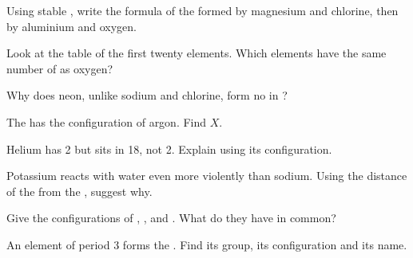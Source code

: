 \begin{exercise}[$\star\star$]\label{exo:g10:electron-shells:8}
Using stable , write the formula of the  formed by
magnesium and chlorine, then by aluminium and oxygen.
\end{exercise}

\begin{exercise}[$\star\star$]\label{exo:g10:electron-shells:9}
Look at the table of the first twenty elements. Which elements have the
same number of  as oxygen?
\end{exercise}

\begin{exercise}[$\star\star$]\label{exo:g10:electron-shells:10}
Why does neon, unlike sodium and chlorine, form no  in ?
\end{exercise}

\begin{exercise}[$\star\star$]\label{exo:g10:electron-shells:11}
The   has the configuration of argon. Find $X$.
\end{exercise}

\begin{exercise}[$\star\star\star$]\label{exo:g10:electron-shells:12}
Helium has 2  but sits in  18, not  2.
Explain using its configuration.
\end{exercise}

\begin{exercise}[$\star\star\star$]\label{exo:g10:electron-shells:13}
Potassium reacts with water even more violently than sodium. Using the
distance of the  from the , suggest why.
\end{exercise}

\begin{exercise}[$\star\star\star$]\label{exo:g10:electron-shells:14}
Give the configurations of , ,  and
. What do they have in common?
\end{exercise}

\begin{exercise}[$\star\star\star$]\label{exo:g10:electron-shells:15}
An element of period 3 forms the  . Find its group, its
configuration and its name.
\end{exercise}

